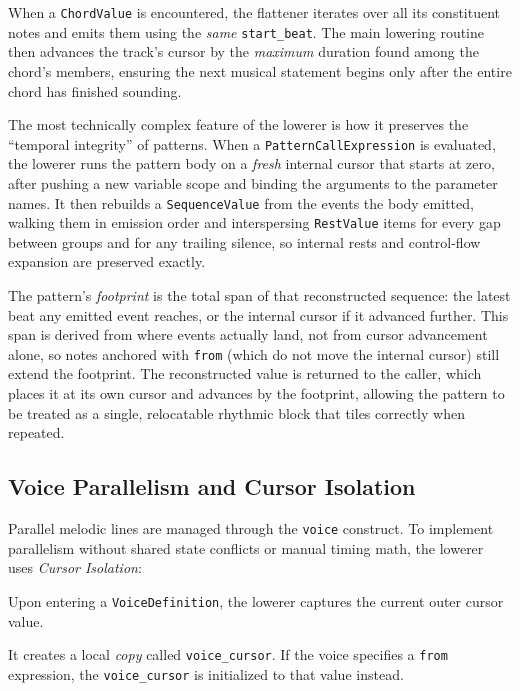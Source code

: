 When a \texttt{ChordValue} is encountered, the flattener iterates over all its constituent notes and emits them using
the \textit{same} \texttt{start\_beat}.
The main lowering routine then advances the track's cursor by the \textit{maximum} duration found among the chord's
members, ensuring the next musical statement begins only after the entire chord has finished sounding.

The most technically complex feature of the lowerer is how it preserves the ``temporal integrity'' of patterns.
When a \texttt{PatternCallExpression} is evaluated, the lowerer runs the pattern body on a \emph{fresh} internal cursor
that starts at zero, after pushing a new variable scope and binding the arguments to the parameter names.
It then rebuilds a \texttt{SequenceValue} from the events the body emitted, walking them in emission order and
interspersing \texttt{RestValue} items for every gap between groups and for any trailing silence, so internal rests and
control-flow expansion are preserved exactly.

The pattern's \emph{footprint} is the total span of that reconstructed sequence: the latest beat any emitted event
reaches, or the internal cursor if it advanced further.
This span is derived from where events actually land, not from cursor advancement alone, so notes anchored with
\texttt{from} (which do not move the internal cursor) still extend the footprint.
The reconstructed value is returned to the caller, which places it at its own cursor and advances by the footprint,
allowing the pattern to be treated as a single, relocatable rhythmic block that tiles correctly when repeated.

\subsection{Voice Parallelism and Cursor Isolation}\label{detail-subsec:voice-parallelism-and-cursor-isolation}

Parallel melodic lines are managed through the \texttt{voice} construct.
To implement parallelism without shared state conflicts or manual timing math, the lowerer uses
\textit{Cursor Isolation}:

Upon entering a \texttt{VoiceDefinition}, the lowerer captures the current outer cursor value.

It creates a local \textit{copy} called \texttt{voice\_cursor}.
If the voice specifies a \texttt{from} expression, the \texttt{voice\_cursor} is initialized to that value instead.


